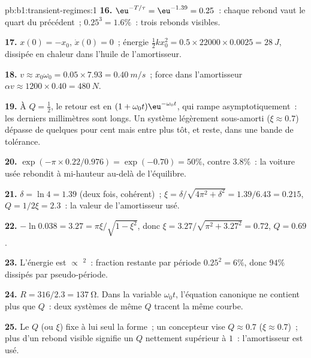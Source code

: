 \begin{solution}{pb:b1:transient-regimes:1}
\textbf{16.} $\eu^{-T/\tau} = \eu^{-1.39} = 0.25$~: chaque rebond vaut le
quart du précédent~; $0.25^3 = 1.6\%$~: trois rebonds visibles.

\textbf{17.} $x(0) = -x_0$, $\dot x(0) = 0$~; énergie $\tfrac12 kx_0^2 =
0.5 \times 22000 \times 0.0025 = \qty{28}{J}$, dissipée en chaleur dans
l'huile de l'amortisseur.

\textbf{18.} $v \approx x_0\omega_0 = 0.05 \times 7.93 = \qty{0.40}{m/s}$~;
force dans l'amortisseur $\alpha v \approx 1200 \times 0.40 = \qty{480}{N}$.

\textbf{19.} À $Q = \tfrac12$, le retour est en $(1 + \omega_0 t)\eu^{-\omega_0
t}$, qui rampe asymptotiquement~: les derniers millimètres sont longs.
Un système légèrement sous-amorti ($\xi \approx 0.7$) dépasse de
quelques pour cent mais entre plus tôt, et reste, dans une bande de tolérance.

\textbf{20.} $\exp(-\pi \times 0.22/0.976) = \exp(-0.70) = 50\%$, contre
$3.8\%$~: la voiture usée rebondit à mi-hauteur au-delà de l'équilibre.

\textbf{21.} $\delta = \ln 4 = 1.39$ (deux fois, cohérent)~; $\xi =
\delta/\sqrt{4\pi^2 + \delta^2} = 1.39/6.43 = 0.215$, $Q = 1/2\xi = 2.3$~:
la valeur de l'amortisseur usé.

\textbf{22.} $-\ln 0.038 = 3.27 = \pi\xi/\sqrt{1 - \xi^2}$, donc $\xi =
3.27/\sqrt{\pi^2 + 3.27^2} = 0.72$, $Q = 0.69$.

\textbf{23.} L'énergie est $\propto$ $^2$~: fraction restante par
période $0.25^2 = 6\%$, donc $94\%$ dissipés par pseudo-période.

\textbf{24.} $R = 316/2.3 = \qty{137}{\ohm}$. Dans la variable $\omega_0 t$,
l'équation canonique ne contient plus que $Q$~: deux systèmes de même
$Q$ tracent la même courbe.

\textbf{25.} Le  $Q$ (ou $\xi$) fixe à lui seul la
forme~; un concepteur vise $Q \approx 0.7$ ($\xi \approx 0.7$)~; plus
d'un rebond visible signifie un $Q$ nettement supérieur à $1$~:
l'amortisseur est usé.
\end{solution}
